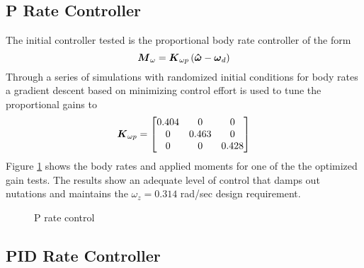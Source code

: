 \subsection{P Rate Controller}
\label{subsec:PRateControl}
The initial controller tested is the proportional body rate controller of the form
\begin{equation}
  \boldsymbol{M}_{\omega} = \boldsymbol{K}_{\omega p} \left( \boldsymbol{\hat{\omega}} - \boldsymbol{\omega}_d \right)
  \label{eqn:PRateControl}
\end{equation}
Through a series of simulations with randomized initial conditions for body rates a gradient descent based on minimizing control effort is used to tune the proportional gains to
\begin{equation}
  \boldsymbol{K}_{\omega p} = \begin{bmatrix} 0.404 & 0 & 0 \\ 0 & 0.463 & 0 \\ 0 & 0 & 0.428 \end{bmatrix}
\end{equation}
Figure \ref{fig:PRateControl} shows the body rates and applied moments for one of the the optimized gain tests.  The results show an adequate level of control that damps out nutations and maintains the $\omega_z = 0.314$ rad/sec design requirement.
\begin{figure}[H]
  \centerline{}
  \caption{P rate control}
  \label{fig:PRateControl}
\end{figure}

\subsection{PID Rate Controller}
\label{subsec:PIDRateControl}

